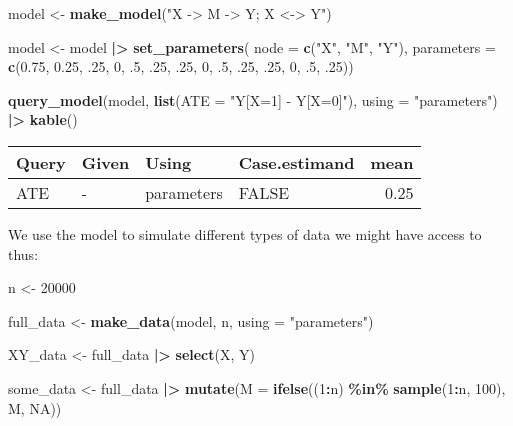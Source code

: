 \documentclass[
  12pt,
]{book}
\newenvironment{Shaded}{\begin{snugshade}}{\end{snugshade}}
\newcommand{\AttributeTok}[1]{\textcolor[rgb]{0.13,0.29,0.53}{#1}}
\newcommand{\ConstantTok}[1]{\textcolor[rgb]{0.56,0.35,0.01}{#1}}
\newcommand{\DecValTok}[1]{\textcolor[rgb]{0.00,0.00,0.81}{#1}}
\newcommand{\FloatTok}[1]{\textcolor[rgb]{0.00,0.00,0.81}{#1}}
\newcommand{\FunctionTok}[1]{\textcolor[rgb]{0.13,0.29,0.53}{\textbf{#1}}}
\newcommand{\NormalTok}[1]{#1}
\newcommand{\OtherTok}[1]{\textcolor[rgb]{0.56,0.35,0.01}{#1}}
\newcommand{\SpecialCharTok}[1]{\textcolor[rgb]{0.81,0.36,0.00}{\textbf{#1}}}
\newcommand{\StringTok}[1]{\textcolor[rgb]{0.31,0.60,0.02}{#1}}
\begin{document}
\begin{Shaded}
\begin{Highlighting}[]
\NormalTok{model }\OtherTok{\textless{}{-}} 
  \FunctionTok{make\_model}\NormalTok{(}\StringTok{"X {-}\textgreater{} M {-}\textgreater{} Y;  X \textless{}{-}\textgreater{} Y"}\NormalTok{) }

\NormalTok{model }\OtherTok{\textless{}{-}}\NormalTok{ model }\SpecialCharTok{|\textgreater{}}  
  \FunctionTok{set\_parameters}\NormalTok{(}
       \AttributeTok{node =} \FunctionTok{c}\NormalTok{(}\StringTok{"X"}\NormalTok{, }\StringTok{"M"}\NormalTok{, }\StringTok{"Y"}\NormalTok{),}
       \AttributeTok{parameters =} \FunctionTok{c}\NormalTok{(}\FloatTok{0.75}\NormalTok{, }\FloatTok{0.25}\NormalTok{,}
\NormalTok{         .}\DecValTok{25}\NormalTok{, }\DecValTok{0}\NormalTok{, .}\DecValTok{5}\NormalTok{, .}\DecValTok{25}\NormalTok{,}
\NormalTok{         .}\DecValTok{25}\NormalTok{, }\DecValTok{0}\NormalTok{, .}\DecValTok{5}\NormalTok{, .}\DecValTok{25}\NormalTok{,}
\NormalTok{         .}\DecValTok{25}\NormalTok{, }\DecValTok{0}\NormalTok{, .}\DecValTok{5}\NormalTok{, .}\DecValTok{25}\NormalTok{))}

\FunctionTok{query\_model}\NormalTok{(model, }\FunctionTok{list}\NormalTok{(}\AttributeTok{ATE =} \StringTok{"Y[X=1] {-} Y[X=0]"}\NormalTok{), }\AttributeTok{using =} \StringTok{"parameters"}\NormalTok{)  }\SpecialCharTok{|\textgreater{}} \FunctionTok{kable}\NormalTok{()}
\end{Highlighting}
\end{Shaded}

\begin{tabular}{l|l|l|l|r}
\hline
Query & Given & Using & Case.estimand & mean\\
\hline
ATE & - & parameters & FALSE & 0.25\\
\hline
\end{tabular}

We use the model to simulate different types of data we might have access to thus:

\begin{Shaded}
\begin{Highlighting}[]
\NormalTok{n }\OtherTok{\textless{}{-}} \DecValTok{20000}

\NormalTok{full\_data }\OtherTok{\textless{}{-}}  \FunctionTok{make\_data}\NormalTok{(model, n, }\AttributeTok{using =} \StringTok{"parameters"}\NormalTok{)}

\NormalTok{XY\_data }\OtherTok{\textless{}{-}}\NormalTok{ full\_data }\SpecialCharTok{|\textgreater{}} \FunctionTok{select}\NormalTok{(X, Y)}

\NormalTok{some\_data  }\OtherTok{\textless{}{-}}\NormalTok{ full\_data }\SpecialCharTok{|\textgreater{}}  \FunctionTok{mutate}\NormalTok{(}\AttributeTok{M =} \FunctionTok{ifelse}\NormalTok{((}\DecValTok{1}\SpecialCharTok{:}\NormalTok{n) }\SpecialCharTok{\%in\%} \FunctionTok{sample}\NormalTok{(}\DecValTok{1}\SpecialCharTok{:}\NormalTok{n, }\DecValTok{100}\NormalTok{), M, }\ConstantTok{NA}\NormalTok{))}
\end{Highlighting}
\end{Shaded}
\end{document}
